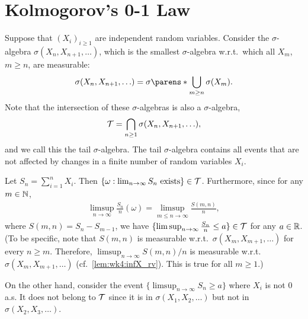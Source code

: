 \documentclass[12pt]{article}
\begin{document}
\section{Kolmogorov's 0-1 Law}

Suppose that $(X_i)_{i\geq 1} $ are independent random variables. Consider the $\sigma$-algebra $\sigma(X_n,X_{n+1},\ldots)$, which is the smallest $\sigma$-algebra w.r.t.\ which all $X_m$, $m\geq n$, are measurable: 
\begin{align*}
\sigma(X_n,X_{n+1},\ldots) = \sigma\parens*{\bigcup_{m\geq n} \sigma(X_m)}.
\end{align*}
Note that the intersection of these $\sigma$-algebras is also a $\sigma$-algebra, 
\begin{align*}
\mathcal{T}=\bigcap_{n\geq 1}\sigma(X_n,X_{n+1},\ldots),
\end{align*}
and we call this the tail $\sigma$-algebra. The tail $\sigma$-algebra contains all events that are not affected by changes in a finite number of random variables $X_i$.

Let $S_n= \sum_{i=1}^n X_i$. Then $\{\omega: \lim_{n \to \infty} S_n \text{ exists}\}\in\mathcal{T}$. Furthermore, since for any $m\in\mathbb{N}$, 
\begin{align*}
\limsup_{n\to\infty} \frac{S_n}{n}(\omega) = \limsup_{m \leq n\to\infty} \frac{S(m,n)}{n},
\end{align*}
where $S(m,n) = S_n - S_{m-1}$, we have $\{\limsup_{n\to\infty} \frac{S_n}{n}\leq a\}\in\mathcal{T}$ for any $a\in\mathbb{R}$. (To be specific, note that $S(m,n)$ is measurable w.r.t.\ $\sigma(X_m, X_{m+1},\ldots)$ for every $n \geq m$. Therefore, $\limsup_{n\to\infty}S(m,n)/n$ is measurable w.r.t.\ $\sigma(X_m, X_{m+1},\ldots)$ (cf.\ \cref{lem:wk4:infX_rv}). This is true for all $m\geq1$.)

On the other hand, consider the event $\{\limsup_{n\to\infty} S_n\geq a\}$ where $X_i$ is not 0 a.s. It does not belong to $\mathcal{T}$ since it is in $\sigma(X_1,X_2,\ldots)$ but not in $\sigma(X_2,X_3,\ldots)$.
\end{document}
